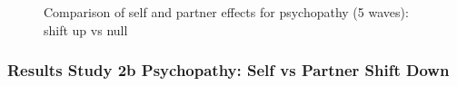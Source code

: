 \documentclass[
  singlecolumn]{article}
\begin{document}
\begin{figure}


\caption{\label{fig-results-psychopathy-self-partner-up-long-comparison}Comparison
of self and partner effects for psychopathy (5 waves): shift up vs null}

\end{figure}%

\newpage{}

\subsubsection{Results Study 2b Psychopathy: Self vs Partner Shift
Down}\label{results-study-2b-psychopathy-self-vs-partner-shift-down}
\end{document}
